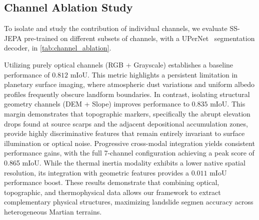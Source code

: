 \subsection{Channel Ablation Study}
\label{sec:abla-study}

To isolate and study the contribution of individual channels, we evaluate SS-JEPA pre-trained on different subsets of channels, with a UPerNet~\cite{DBLP:journals/corr/abs-1807-10221} segmentation decoder, in \cref{tab:channel_ablation}.

Utilizing purely optical channels (RGB + Grayscale) establishes a baseline performance of $0.812$ mIoU. This metric highlights a persistent limitation in planetary surface imaging, where atmospheric dust variations and uniform albedo profiles frequently obscure landform boundaries. In contrast, isolating structural geometry channels (DEM + Slope) improves performance to $0.835$ mIoU. This margin demonstrates that topographic markers, specifically the abrupt elevation drops found at source scarps and the adjacent depositional accumulation zones, provide highly discriminative features that remain entirely invariant to surface illumination or optical noise. Progressive cross-modal integration yields consistent performance gains, with the full 7-channel configuration achieving a peak score of 0.865 mIoU. While the thermal inertia modality exhibits a lower native spatial resolution, its integration with geometric features provides a $0.011$ mIoU performance boost. These results demonstrate that combining optical, topographic, and thermophysical data allows our framework to extract complementary physical structures, maximizing landslide segmen accuracy across heterogeneous Martian terrains.



